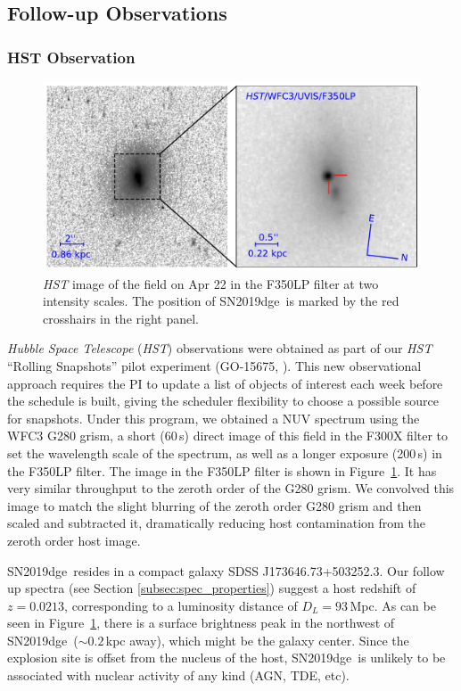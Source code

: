 \documentclass[twocolumn]{aastex63}
\newcommand{\name}{SN2019dge}
\begin{document}
\begin{CJK*}{UTF8}{gbsn}
\subsection{Follow-up Observations}
\subsubsection{HST Observation}
\begin{figure}
	\centering
	\includegraphics[width=\columnwidth]{figures/offset.pdf}
	\caption{\textit{HST} image of the field on Apr 22 in the F350LP filter at two intensity scales. The 
	position of \name\ is marked by the red crosshairs in the right panel.
		\label{fig:offset}}
\end{figure}
\textit{Hubble Space Telescope} (\textit{HST}) observations were obtained as part of our \textit{HST}
``Rolling Snapshots'' pilot experiment (GO-15675, \citealt{Fruchter2018}). This new observational 
approach requires the PI to update a list of objects of interest each week before the schedule is built, 
giving the scheduler flexibility to choose a possible source for snapshots. Under this program, we 
obtained a NUV spectrum using the WFC3 G280 grism, a short (60\,s) direct image of this field in the 
F300X filter to set the wavelength scale of the spectrum, as well as a longer exposure (200\,s) in the 
F350LP filter. The image in the F350LP filter is shown in Figure~\ref{fig:offset}. It has very similar 
throughput to the zeroth order of the G280 grism. We convolved this image to match the slight 
blurring of the zeroth order G280 grism and then scaled and subtracted it, dramatically reducing host 
contamination from the zeroth order host image.

\name\ resides in a compact galaxy SDSS J173646.73+503252.3. Our follow up spectra (see Section 
\ref{subsec:spec_properties}) suggest a host redshift of $z=0.0213$, corresponding to a luminosity 
distance of $D_L = 93$\,Mpc. As can be seen in Figure~\ref{fig:offset}, there is a surface brightness 
peak in the northwest of \name\ ($\sim0.2$\,kpc away), which might be the galaxy center. Since the 
explosion site is offset from the nucleus of the host, \name\ is unlikely to be associated with nuclear 
activity of any kind (AGN, TDE, etc).


\end{CJK*}
\end{document}
